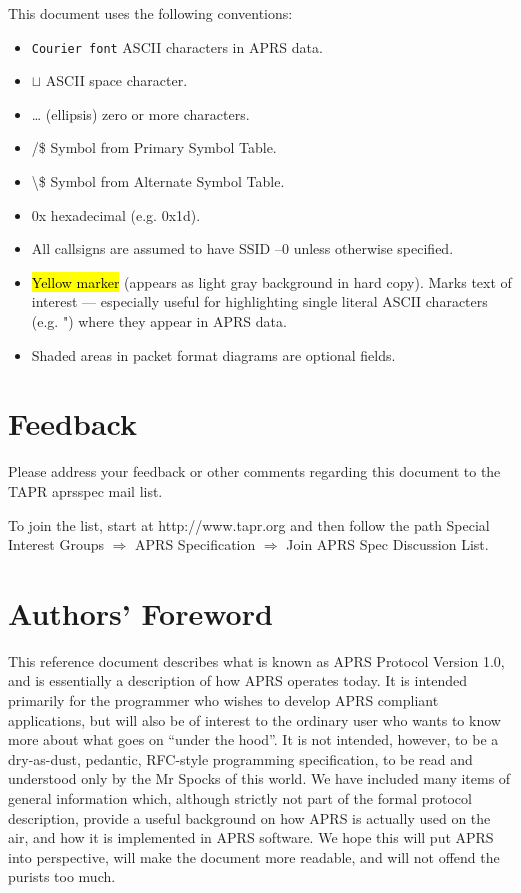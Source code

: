 \documentclass{scrreprt}[letter]
\begin{document}
This document uses the following conventions:
\begin{itemize}

\item \texttt {Courier font} ASCII characters in APRS data.

\item $\sqcup$ ASCII space character.

\item … (ellipsis) zero or more characters.

\item /\$ Symbol from Primary Symbol Table.

\item \textbackslash\$ Symbol from Alternate Symbol Table.

\item 0x hexadecimal (e.g. 0x1d).

\item All callsigns are assumed to have SSID –0 unless otherwise specified.

\item \hl{Yellow marker} (appears as light gray background in hard copy).
Marks text of interest — especially useful for highlighting single
literal ASCII characters (e.g. ") where they appear in APRS data.

\item Shaded areas in packet format diagrams are optional fields.

\end{itemize}

\section*{Feedback}

Please address your feedback or other comments regarding this document to
the TAPR aprsspec mail list.

To join the list, start at http://www.tapr.org and then follow the path Special
Interest Groups $\Rightarrow$ APRS Specification $\Rightarrow$ Join APRS Spec Discussion List.


\section*{Authors’ Foreword}

This reference document describes what is known as APRS Protocol
Version 1.0, and is essentially a description of how APRS operates
today.  It is intended primarily for the programmer who wishes to
develop APRS compliant applications, but will also be of interest to
the ordinary user who wants to know more about what goes on “under the
hood”.  It is not intended, however, to be a dry-as-dust, pedantic,
RFC-style programming specification, to be read and understood only by
the Mr Spocks of this world. We have included many items of general
information which, although strictly not part of the formal protocol
description, provide a useful background on how APRS is actually used
on the air, and how it is implemented in APRS software. We hope this
will put APRS into perspective, will make the document more readable,
and will not offend the purists too much.
\end{document}
